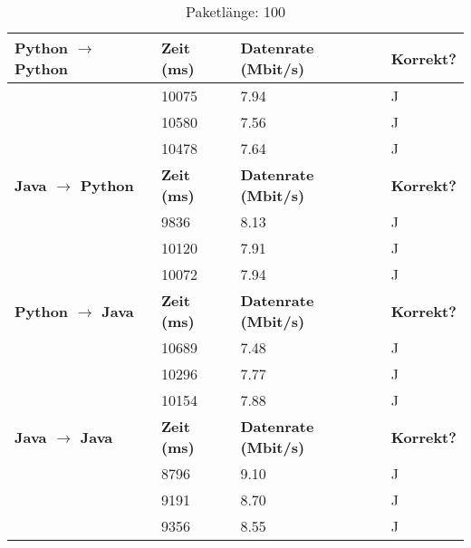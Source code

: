 \documentclass{article}
\begin{document}
    \begin{table}[]
        \caption{Paketlänge: 100}
        \label{tab:my-tablev2_100}
        \begin{tabular}{|l|l|l|l|}
            \hline
            \textbf{Python $\rightarrow$ Python} & \textbf{Zeit (ms)} & \textbf{Datenrate (Mbit/s)} & \textbf{Korrekt?} \\ \hline
            & 10075      & 7.94         & J        \\ \cline{2-4}
            & 10580      & 7.56         & J        \\ \cline{2-4}
            & 10478      & 7.64         & J        \\ \hline
            \textbf{Java $\rightarrow$ Python}   & \textbf{Zeit (ms)} & \textbf{Datenrate (Mbit/s)} & \textbf{Korrekt?} \\ \hline
            & 9836       & 8.13         & J        \\ \cline{2-4}
            & 10120      & 7.91         & J        \\ \cline{2-4}
            & 10072      & 7.94         & J        \\ \hline
            \textbf{Python $\rightarrow$ Java}  & \textbf{Zeit (ms)} & \textbf{Datenrate (Mbit/s)} & \textbf{Korrekt?} \\ \hline
            & 10689      & 7.48         & J        \\ \cline{2-4}
            & 10296      & 7.77         & J        \\ \cline{2-4}
            & 10154      & 7.88         & J        \\ \hline
            \textbf{Java $\rightarrow$ Java}   & \textbf{Zeit (ms)} & \textbf{Datenrate (Mbit/s)} & \textbf{Korrekt?} \\ \hline
            & 8796       & 9.10         & J        \\ \cline{2-4}
            & 9191       & 8.70         & J        \\ \cline{2-4}
            & 9356       & 8.55         & J        \\ \hline
        \end{tabular}
    \end{table}
\end{document}
